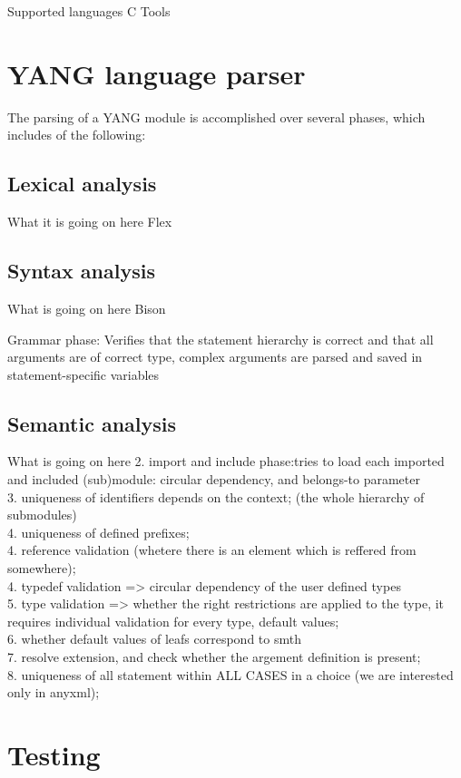 \documentclass[conference]{IEEEtran}
\begin{document}
Supported languages
C
Tools

\section{YANG language parser}
The parsing of a YANG module is accomplished over several phases, which includes of the following:
\subsection{Lexical analysis}
What it is going on here
Flex

\subsection{Syntax analysis}
What is going on here
Bison

Grammar phase:
Verifies that the statement hierarchy is correct and that all arguments are of correct type, complex arguments are parsed and saved in statement-specific variables
 
\subsection{Semantic analysis}
What is going on here
2. import and include phase:tries to load each imported and included (sub)module: circular dependency, and belongs-to parameter\\
3. uniqueness of identifiers depends on  the context; (the whole hierarchy of submodules) \\
4. uniqueness of defined prefixes; \\
4. reference validation (whetere there is an element which is reffered from somewhere);\\
4. typedef validation => circular dependency of the user defined types\\
5. type validation => whether the right restrictions are applied to the type, it requires individual validation for every type, default values;\\
6. whether default values of leafs correspond to smth\\
7. resolve extension, and check whether the argement definition is present;\\
8. uniqueness of all statement within ALL CASES in a choice (we are interested only in anyxml);\\

\section{Testing}
\end{document}
